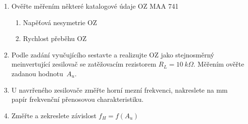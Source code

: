 \begin{minipage}[H][11.48cm][c]{0.8\textwidth}
  \begin{enumerate}
    \item
      Ověřte měřením některé katalogové údaje OZ MAA 741
      	\begin{enumerate}
      		\item
      			Napěťová nesymetrie OZ
      		\item
      			Rychlost přeběhu OZ
      	\end{enumerate}
    \item
      Podle zadání vyučujícího sestavte a realizujte OZ jako stejnosměrný meinvertující zesilovač se zatěžovacím rezistorem $R_L = 10~k\Omega$. Měřením ověřte zadanou hodnotu~$A_u$.
    \item
			U navrřeného zesilovače změřte horní mezní frekvenci, nakreslete na mm papír frekvenční přenosovou charakteristiku.
		\item
			Změřte a zekreslete závislost $f_H = f(A_u)$
	\end{enumerate}
\end{minipage}


